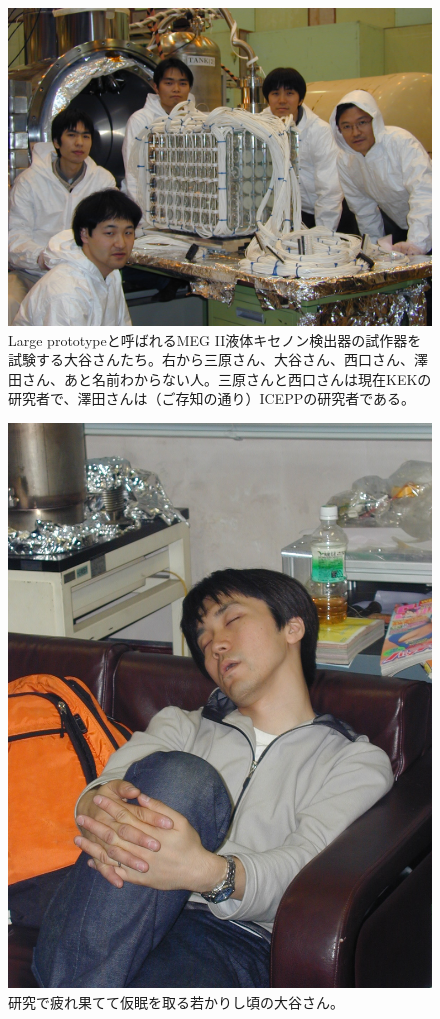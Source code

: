 \begin{figure}[h]
  \centering
  \includegraphics[width=0.9\columnwidth,clip]{fig/wataru.jpg}
  \caption{Large prototypeと呼ばれるMEG II液体キセノン検出器の試作器を試験する大谷さんたち。右から三原さん、大谷さん、西口さん、澤田さん、あと名前わからない人。三原さんと西口さんは現在KEKの研究者で、澤田さんは（ご存知の通り）ICEPPの研究者である。}
  \label{fig:wataru}
\end{figure}




\begin{figure}
  \vspace*{-\intextsep}
  \centering
  \includegraphics[width=0.3\columnwidth]{fig/wataru_sleeping.jpg}
  \caption{研究で疲れ果てて仮眠を取る若かりし頃の大谷さん。}
  \label{fig:wataru_sleeping}
\end{figure}


